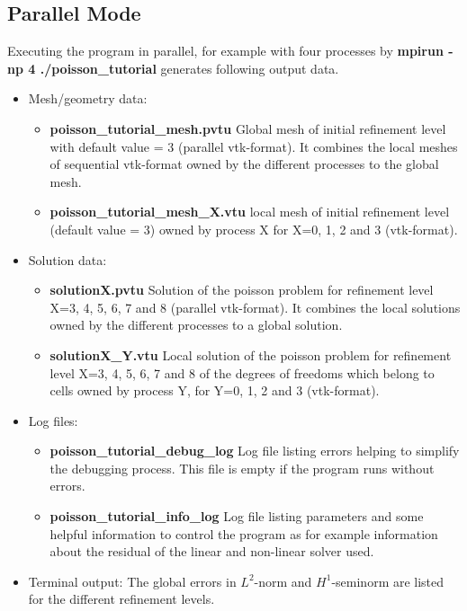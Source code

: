 \documentclass[a4paper, 11pt, twoside]{article}
\begin{document}
\subsection{Parallel Mode} 
Executing the program in parallel, for example with four processes by \textbf{mpirun -np 4 ./poisson\_tutorial}   
generates following output data. 
\begin{itemize}
\item Mesh/geometry data:
\begin{itemize}
\item \textbf{poisson\_tutorial\_mesh.pvtu} Global mesh of initial refinement level with default value = 3 (parallel vtk-format). It combines the local meshes of sequential vtk-format owned by the different processes to the global mesh.
\item \textbf{poisson\_tutorial\_mesh\_X.vtu} local mesh of initial refinement level (default value = 3) owned by process X for X=0, 1, 2 and 3 (vtk-format).
\end{itemize}
\item Solution data:
\begin{itemize}
\item \textbf{solutionX.pvtu} Solution of the poisson problem for refinement level X=3, 4, 5, 6, 7 and 8  (parallel vtk-format). It combines the local solutions owned by the different processes to a global solution.
\item \textbf{solutionX\_Y.vtu} Local solution of the poisson problem for refinement level X=3, 4, 5, 6, 7 and 8 of the degrees of freedoms which belong to cells owned by process Y, for Y=0, 1, 2 and 3 (vtk-format).
\end{itemize}
\item Log files:
\begin{itemize}
\item \textbf{poisson\_tutorial\_debug\_log} Log file listing errors helping to simplify the debugging process. This file is empty if the program runs without errors.
\item \textbf{poisson\_tutorial\_info\_log} Log file listing parameters and some helpful information to control 
      the program as for example information about the residual of the linear and non-linear solver used.
\end{itemize}
\item Terminal output: The global errors in $L^2$-norm and $H^1$-seminorm are listed for the different refinement levels. 
\end{itemize}
\end{document}
